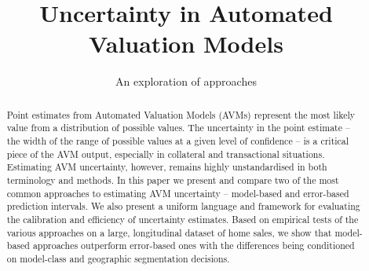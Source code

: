 \documentclass[colTwo]{anon}
\theoremstyle{definition}
\begin{document}

\title{Uncertainty in Automated Valuation Models}

\subtitle{An exploration of approaches} 
 	



\CCbY

\begin{abstracts}
\begin{abstract}
Point estimates from Automated Valuation Models (AVMs) represent the most likely value from a distribution of possible values. The uncertainty in the point estimate -- the width of the range of possible values at a given level of confidence -- is a critical piece of the AVM output, especially in collateral and transactional situations. Estimating AVM uncertainty, however, remains highly unstandardised in both terminology and methods. In this paper we present and compare two of the most common approaches to estimating AVM uncertainty -- model-based and error-based prediction intervals. We also present a uniform language and framework for evaluating the calibration and efficiency of uncertainty estimates. Based on empirical tests of the various approaches on a large, longitudinal dataset of home sales, we show that model-based approaches outperform error-based ones with the differences being conditioned on model-class and geographic segmentation decisions. 

\end{abstract}

\end{abstracts}

\maketitle
 
\end{document}
